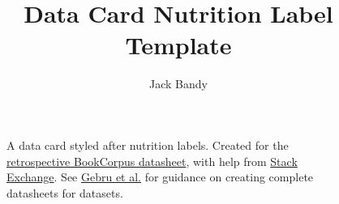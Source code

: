 \documentclass{article}
\title{Data Card Nutrition Label Template}
\author{Jack Bandy}
\begin{document}
\begin{figure}
    \centering
    \resizebox{11cm}{!}{
    
    
    
    }
    
    \caption{A data card styled after nutrition labels. Created for the \href{https://arxiv.org/abs/2105.05241}{retrospective BookCorpus datasheet}, with help from \href{https://tex.stackexchange.com/questions/118600/how-can-i-create-a-nutrition-facts-label}{Stack Exchange}. See \href{https://arxiv.org/abs/1803.09010}{Gebru et al.} for guidance on creating complete datasheets for datasets.}
    \label{fig:data_card}
\end{figure}
\end{document}
